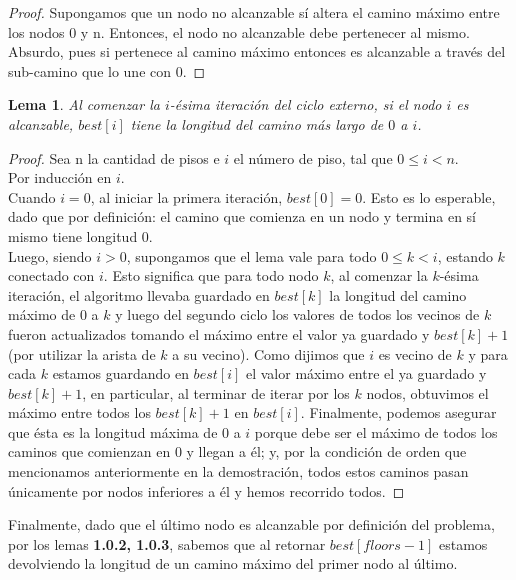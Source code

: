 \documentclass{article}
\newtheorem{lemma}{Lema}[theorem]
\theoremstyle{definition}
\theoremstyle{remark}
\begin{document}
\begin{proof}
Supongamos que un nodo no alcanzable sí altera el camino máximo entre los nodos 0 y n. Entonces, el nodo no alcanzable debe pertenecer al mismo. Absurdo, pues si pertenece al camino máximo entonces es alcanzable a través del sub-camino que lo une con 0.
\end{proof}

\begin{lemma}
Al comenzar la $i$-ésima iteración del ciclo externo, si el nodo $i$ es alcanzable, $best[i]$ tiene la longitud del camino más largo de $0$ a $i$.
\end{lemma}

\begin{proof}
Sea n la cantidad de pisos e $i$ el número de piso, tal que $0 \leq i < n$. \\
Por inducción en $i$. \\

Cuando $i = 0$, al iniciar la primera iteración, $best[0] = 0$. Esto es lo esperable, dado que por definición: el camino que comienza en un nodo y termina en sí mismo tiene longitud 0. \\

Luego, siendo $i > 0$, supongamos que el lema vale para todo $0 \leq k < i$, estando $k$ conectado con $i$. Esto significa que para todo nodo $k$, al comenzar la $k$-ésima iteración, el algoritmo llevaba guardado en $best[k]$ la longitud del camino máximo de $0$ a $k$ y luego del segundo ciclo los valores de todos los vecinos de $k$ fueron actualizados tomando el máximo entre el valor ya guardado y $best[k]+1$ (por utilizar la arista de $k$ a su vecino). Como dijimos que $i$ es vecino de $k$ y para cada $k$ estamos guardando en $best[i]$ el valor máximo entre el ya guardado y $best[k]+1$, en particular, al terminar de iterar por los $k$ nodos, obtuvimos el máximo entre todos los $best[k]+1$ en $best[i]$. Finalmente, podemos asegurar que ésta es la longitud máxima de $0$ a $i$ porque debe ser el máximo de todos los caminos que comienzan en 0 y llegan a él; y, por la condición de orden que mencionamos anteriormente en la demostración, todos estos caminos pasan únicamente por nodos inferiores a él y hemos recorrido todos.
\end{proof}

Finalmente, dado que el último nodo es alcanzable por definición del problema, por los lemas \textbf{1.0.2, 1.0.3}, sabemos que al retornar $best[floors-1]$ estamos devolviendo la longitud de un camino máximo del primer nodo al último.
\end{document}
